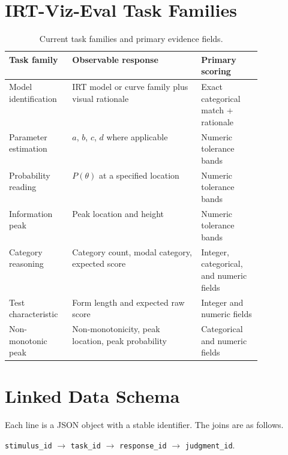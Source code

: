 \documentclass[12pt]{article}
\begin{document}
\section{IRT-Viz-Eval Task Families}

\begin{table}[H]
\centering
\caption{Current task families and primary evidence fields.}
\begin{tabularx}{\linewidth}{>{\raggedright\arraybackslash}p{0.25\linewidth}Y>{\raggedright\arraybackslash}p{0.24\linewidth}}
\toprule
Task family & Observable response & Primary scoring \\
\midrule
Model identification & IRT model or curve family plus visual rationale & Exact categorical match + rationale \\
Parameter estimation & $a$, $b$, $c$, $d$ where applicable & Numeric tolerance bands \\
Probability reading & $P(\theta)$ at a specified location & Numeric tolerance bands \\
Information peak & Peak location and height & Numeric tolerance bands \\
Category reasoning & Category count, modal category, expected score & Integer, categorical, and numeric fields \\
Test characteristic & Form length and expected raw score & Integer and numeric fields \\
Non-monotonic peak & Non-monotonicity, peak location, peak probability & Categorical and numeric fields \\
\bottomrule
\end{tabularx}
\end{table}

\section{Linked Data Schema}

Each line is a JSON object with a stable identifier. The joins are as follows.

\begin{center}
\texttt{stimulus\_id} $\rightarrow$ \texttt{task\_id} $\rightarrow$ \texttt{response\_id} $\rightarrow$ \texttt{judgment\_id}.
\end{center}
\end{document}
